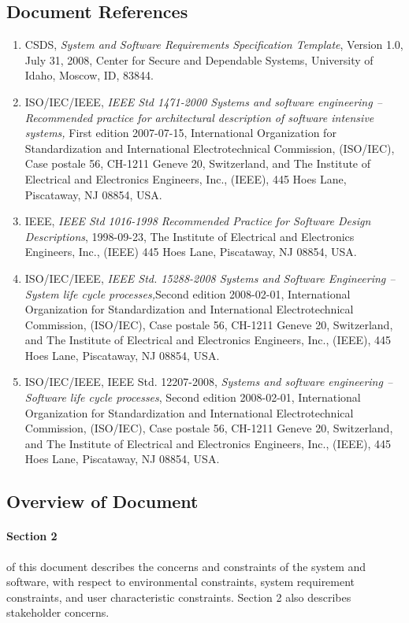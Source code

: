 \documentclass[12pt,a4paper,titlepage]{article}
\begin{document}
\subsection{Document References}
\begin{enumerate}
\item CSDS, \textit{System and Software Requirements Specification Template}, Version 1.0, July
31, 2008, Center for Secure and Dependable Systems, University of Idaho, Moscow, ID, 83844.

\item ISO/IEC/IEEE, \textit{IEEE Std 1471-2000 Systems and software engineering -- Recommended practice for architectural description of software intensive systems,} First edition 2007-07-15, International Organization for Standardization and International Electrotechnical Commission, (ISO/IEC), Case postale 56, CH-1211 Geneve 20, Switzerland, and The Institute of Electrical and Electronics Engineers, Inc., (IEEE), 445 Hoes Lane, Piscataway, NJ 08854, USA.

\item IEEE, \textit{IEEE Std 1016-1998 Recommended Practice for Software Design Descriptions}, 1998-09-23, The Institute of Electrical and Electronics Engineers, Inc., (IEEE) 445 Hoes Lane, Piscataway, NJ 08854, USA.

\item ISO/IEC/IEEE, \textit{IEEE Std. 15288-2008 Systems and Software Engineering -- System life cycle processes,}Second edition 2008-02-01, International Organization for Standardization and International Electrotechnical Commission, (ISO/IEC), Case postale 56, CH-1211 Geneve 20, Switzerland, and The Institute of Electrical and Electronics Engineers, Inc., (IEEE), 445 Hoes Lane, Piscataway, NJ 08854, USA.

\item ISO/IEC/IEEE, IEEE Std. 12207-2008, \textit{Systems and software engineering -- Software life cycle processes}, Second edition 2008-02-01, International Organization for Standardization and International Electrotechnical Commission, (ISO/IEC), Case postale 56, CH-1211 Geneve 20, Switzerland, and The Institute of Electrical and Electronics Engineers, Inc., (IEEE), 445 Hoes Lane, Piscataway, NJ 08854, USA.
\end{enumerate}

\subsection{Overview of Document}
\paragraph{Section 2} of this document describes the concerns and constraints of the system and software, with respect to environmental constraints, system requirement constraints, and user characteristic constraints. Section 2 also describes stakeholder concerns.
\end{document}
